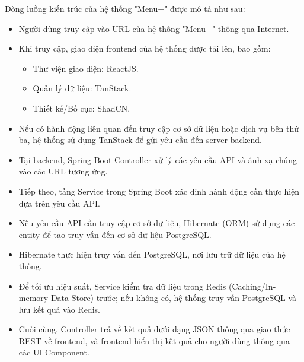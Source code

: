Dòng luồng kiến trúc của hệ thống "Menu+" được mô tả như sau:
\begin{itemize}
    \item Người dùng truy cập vào URL của hệ thống "Menu+" thông qua Internet.
    \item Khi truy cập, giao diện frontend của hệ thống được tải lên, bao gồm:
    \begin{itemize}
        \item Thư viện giao diện: ReactJS.
        \item Quản lý dữ liệu: TanStack.
        \item Thiết kế/Bố cục: ShadCN.
    \end{itemize}
    \item Nếu có hành động liên quan đến truy cập cơ sở dữ liệu hoặc dịch vụ bên thứ ba, hệ thống sử dụng TanStack để gửi yêu cầu đến server backend.
    \item Tại backend, Spring Boot Controller xử lý các yêu cầu API và ánh xạ chúng vào các URL tương ứng.
    \item Tiếp theo, tầng Service trong Spring Boot xác định hành động cần thực hiện dựa trên yêu cầu API.
    \item Nếu yêu cầu API cần truy cập cơ sở dữ liệu, Hibernate (ORM) sử dụng các entity để tạo truy vấn đến cơ sở dữ liệu PostgreSQL.
    \item Hibernate thực hiện truy vấn đến PostgreSQL, nơi lưu trữ dữ liệu của hệ thống.
    \item Để tối ưu hiệu suất, Service kiểm tra dữ liệu trong Redis (Caching/In-memory Data Store) trước; nếu không có, hệ thống truy vấn PostgreSQL và lưu kết quả vào Redis.
    \item Cuối cùng, Controller trả về kết quả dưới dạng JSON thông qua giao thức REST về frontend, và frontend hiển thị kết quả cho người dùng thông qua các UI Component.
\end{itemize}

